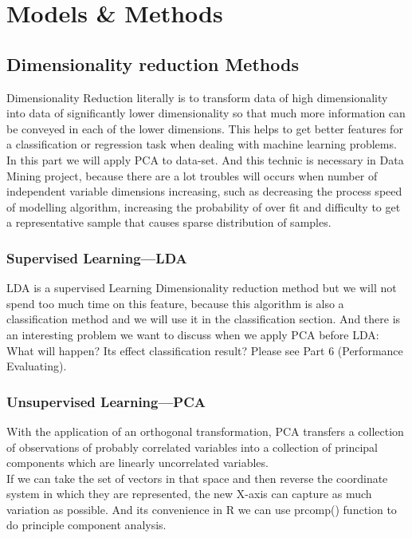 \documentclass{article}\usepackage[]{graphicx}\usepackage[]{color}
\begin{document}
	\section{Models \& Methods}
	\subsection{Dimensionality reduction Methods}
\noindent	Dimensionality Reduction literally is to transform data of high dimensionality into data of significantly lower dimensionality so that much more information can be conveyed in each of the lower dimensions. This helps to get better features for a classification or regression task when dealing with machine learning problems.\\
\noindent	In this part we will apply PCA to data-set. And this technic is necessary in Data Mining project, because
	there are a lot troubles will occurs when number of independent variable dimensions increasing, such as decreasing the process speed of modelling algorithm, increasing the probability of over fit and difficulty to get a representative sample that causes sparse distribution of samples.\\
	\subsubsection{Supervised Learning---LDA}
	\noindent	LDA is a supervised Learning Dimensionality reduction method but we will not spend too much time on this feature, because this algorithm is also a classification method and we will 
	use it in the classification section. And there is an interesting problem we want to discuss when we apply PCA before LDA:
	What will happen? Its effect classification result? Please see Part 6 (Performance Evaluating).
	
	\subsubsection{Unsupervised Learning---PCA}
\noindent	With the application of an orthogonal transformation, PCA transfers a collection of observations of probably correlated variables into a collection of principal components which are linearly uncorrelated variables.\\
\noindent	If we can take the set of vectors in that space and then reverse the coordinate system in which they are represented, the new X-axis can capture as much variation as possible.
\noindent	And its convenience in R we can use prcomp() function to do principle component analysis.\\
\end{document}
